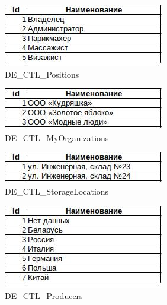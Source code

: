 \listoffigures %
\newpage

\thispagestyle{plain}
\pagestyle{plain}
\hspace{0pt}

\begin{figure}[!h]
    \centering

    \includegraphics[]
    {assets/etalons/CPR_DolzhnostiSotrudnika.jpg}

    \caption{DE\_CTL\_Positions}

    \label{fig:CPR_DolzhnostiSotrudnika}

\end{figure}

\begin{figure}[!h]
    \centering

    \includegraphics[]
    {assets/etalons/CPR_MoiOrganizacii.jpg}

    \caption{DE\_CTL\_MyOrganizations}

    \label{fig:CPR_MoiOrganizacii}
\end{figure}

\begin{figure}[!h]
    \centering

    \includegraphics[]
    {assets/etalons/CPR_MestaHraneniay.jpg}

    \caption{DE\_CTL\_StorageLocations}
    
    \label{fig:CPR_MestaHraneniay}
\end{figure}

\begin{figure}[!h]
    \centering

    \includegraphics[]
    {assets/etalons/CPR_Proizvoditeli.jpg}

    \caption{DE\_CTL\_Producers}

    \label{fig:CPR_Proizvoditeli}
\end{figure}

